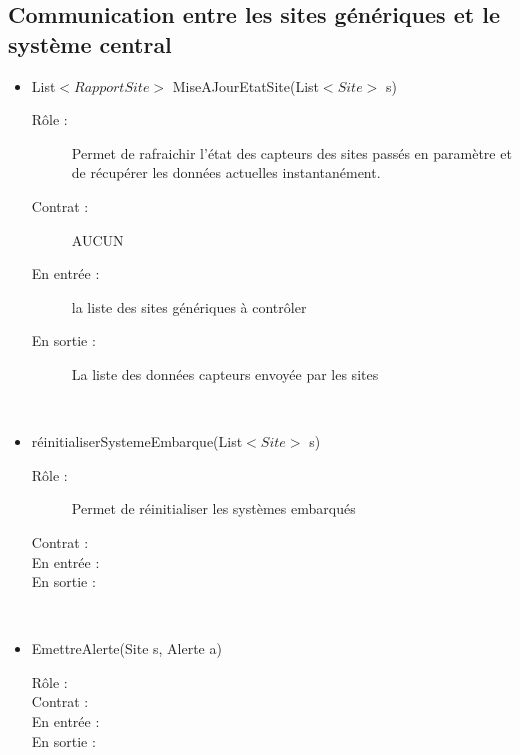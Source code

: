 \subsection{Communication entre les sites génériques et le système central}
\begin{itemize}
	\item List$<RapportSite>$ MiseAJourEtatSite(List$<Site>$  s) 
	\begin{description} 
		\item[Rôle :] Permet de rafraichir l'état des capteurs des sites passés en paramètre et de récupérer les données actuelles instantanément.
		\item[Contrat :] AUCUN 
		\item[En entrée :] la liste des sites génériques à contrôler
		\item[En sortie :] La liste des données capteurs envoyée par les sites
	\end{description}
	~\\
	\item réinitialiserSystemeEmbarque(List$<Site>$  s) 
	\begin{description} 
		\item[Rôle :] Permet de réinitialiser les systèmes embarqués
		\item[Contrat :] 
		\item[En entrée :] 
		\item[En sortie :] 
	\end{description}
	~\\
	\item EmettreAlerte(Site s, Alerte a) 
	\begin{description} 
		\item[Rôle :] 
		\item[Contrat :] 
		\item[En entrée :] 
		\item[En sortie :] 
	\end{description}
	~\\

\end{itemize}
